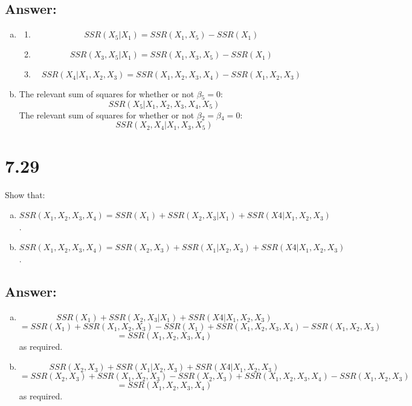 \documentclass{article}
\begin{document}
\subsection{Answer:}

\begin{enumerate}[a)]
\item{}
\begin{enumerate}[1)]
\item{} $$ SSR(X_5|X_1) = SSR(X_1,X_5) - SSR(X_1) $$
\item{} $$ SSR(X_3,X_5|X_1) = SSR(X_1,X_3,X_5) - SSR(X_1) $$
\item{} $$ SSR(X_4|X_1,X_2,X_3) = SSR(X_1,X_2,X_3,X_4) - SSR(X_1,X_2,X_3) $$
\end{enumerate}
\item{} The relevant sum of squares for whether or not $\beta{}_5 = 0$:
$$ SSR(X_5|X_1,X_2,X_3,X_4,X_5) $$
The relevant sum of squares for whether or not $\beta{}_2 = \beta{}_4 = 0$:
$$ SSR(X_2,X_4|X_1,X_3,X_5) $$
\end{enumerate}

\section{7.29}

Show that:
\begin{enumerate}[a)]
\item{} $SSR(X_1,X_2,X_3,X_4) = SSR(X_1) + SSR(X_2,X_3|X_1) + SSR(X4|X_1,X_2,X_3)$.
\item{} $SSR(X_1,X_2,X_3,X_4) = SSR(X_2,X_3) + SSR(X_1|X_2,X_3) + SSR(X4|X_1,X_2,X_3)$.
\end{enumerate}

\subsection{Answer:}

\begin{enumerate}[a)]
\item{} $$ SSR(X_1) + SSR(X_2,X_3|X_1) + SSR(X4|X_1,X_2,X_3) $$
$$ = SSR(X_1) + SSR(X_1,X_2,X_3) - SSR(X_1) + SSR(X_1,X_2,X_3,X_4) - SSR(X_1,X_2,X_3) $$
$$ = SSR(X_1,X_2,X_3,X_4) $$
as required.
\item{} $$ SSR(X_2,X_3) + SSR(X_1|X_2,X_3) + SSR(X4|X_1,X_2,X_3) $$
$$ = SSR(X_2,X_3) + SSR(X_1,X_2,X_3) - SSR(X_2,X_3) + SSR(X_1,X_2,X_3,X_4) - SSR(X_1,X_2,X_3) $$
$$ = SSR(X_1,X_2,X_3,X_4) $$
as required.
\end{enumerate}
\end{document}
